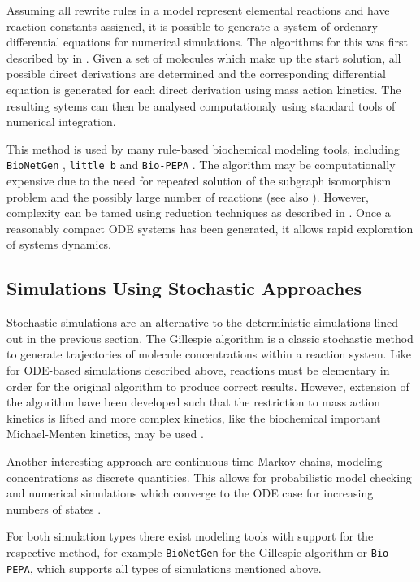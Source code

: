 Assuming all rewrite rules in a model represent elemental reactions and have
reaction constants assigned, it is possible to generate a system of ordenary
differential equations for numerical simulations.  The algorithms for this was
first described by \citet{Blinov2006} in \citeyear{Blinov2006}.  Given a set
of molecules which make up the start solution, all possible direct derivations
are determined and the corresponding differential equation is generated for
each direct derivation using mass action kinetics.  The resulting sytems can
then be analysed computationaly using standard tools of numerical integration.

This method is used by many rule-based biochemical modeling tools, including
\texttt{BioNetGen} \cite{Blinov2004}, \texttt{little b} \cite{Mallavarapu2009}
and \texttt{Bio-PEPA} \cite{Ciocchetta2008}.  The algorithm may be
computationally expensive due to the need for repeated solution of the
subgraph isomorphism problem \cite{Blinov2006} and the possibly large number
of reactions \cite{Danos2008} (see also ).
However, complexity can be tamed using reduction techniques as described in
.  Once a reasonably compact ODE systems has
been generated, it allows rapid exploration of systems dynamics.

\subsection{Simulations Using Stochastic Approaches}
Stochastic simulations are an alternative to the deterministic simulations
lined out in the previous section.  The Gillespie algorithm
\cite{Gillespie1977} is a classic stochastic method to generate trajectories
of molecule concentrations within a reaction system.  Like for ODE-based
simulations described above, reactions must be elementary in order for the
original algorithm to produce correct results.  However, extension of the
algorithm have been developed such that the restriction to mass action
kinetics is lifted and more complex kinetics, like the biochemical important
Michael-Menten kinetics, may be used \cite{Rao2003,Cao2005}.

Another interesting approach are continuous time Markov chains, modeling
concentrations as discrete quantities.  This allows for probabilistic model
checking and numerical simulations which converge to the ODE case for
increasing numbers of states \cite{Calder2006}.

For both simulation types there exist modeling tools with support for the
respective method, for example \texttt{BioNetGen} \cite{Blinov2004} for the
Gillespie algorithm or \texttt{Bio-PEPA}, which supports all types of
simulations mentioned above.
